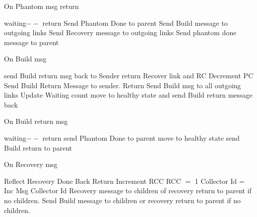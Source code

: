 \documentclass{article}
\begin{document}
	
\begin{algorithm}
\caption{On Phantom msg return}
\label{Phantom Done message received}
\begin{algorithmic}[1]
\State waiting$--$
\State return
\EndIf
{}
\State Send Phantom Done to parent
\State Send Build message to outgoing links
\State Send Recovery message to outgoing links
\Else
\State Send phantom done message to parent
\EndIf
\EndProcedure
\end{algorithmic}
\end{algorithm}	


	
\begin{algorithm}
\caption{On Build msg}
\label{Build message received}
\begin{algorithmic}[1]
\State send Build return msg back to Sender
\State return
\EndIf
\State Recover link and RC
\State Decrement PC
\State Send Build Return Message to sender.
\State Return
\EndIf
\State Send Build msg to all outgoing links
\State Update Waiting count
\State move to healthy state and send Build return message back
\EndIf
\EndProcedure
\end{algorithmic}
\end{algorithm}	



\begin{algorithm}
\caption{On Build return msg}
\label{Build return message received}
\begin{algorithmic}[1]
\State waiting$--$
\State return
\EndIf
{}
\State send Phantom Done to parent
\Else
\State move to healthy state
\State send Build return to parent
\EndIf
\EndIf
\EndProcedure
\end{algorithmic}
\end{algorithm}	


\begin{algorithm}
\caption{On Recovery msg}
\label{Recovery message received}
\begin{algorithmic}[1]
\State Reflect Recovery Done Back
\State Return
\State Increment RCC
\Else
\State RCC $=$ 1
\State Collector Id = Inc Msg Collector Id
\EndIf
{}
\State Recovery message to children of recovery return to parent if no children.
\EndIf
{} 
\State Send Build message to children or recovery return to parent if no children.
\EndIf
\EndProcedure
\end{algorithmic}
\end{algorithm}	
\end{document}
